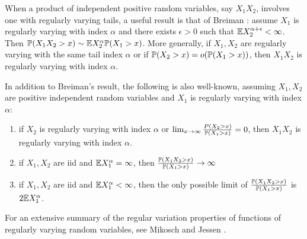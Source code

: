 When a product of independent positive random variables, say $X_1
X_2$, involves one with regularly varying tails, a useful result is
that of Breiman \cite{breiman:1965}: assume $X_1$ is regularly varying
with index $\alpha$ and there exists $\epsilon > 0$ such that
$\E X_2^{\alpha + \epsilon} < \infty$.
Then $\P(X_1 X_2 > x) \sim \E X_2^{\alpha} \P(X_1 > x)$.
More generally, if $X_1, X_2$ are regularly varying with the same tail
index $\alpha$ or if $\P(X_2 > x) = o(\P(X_1 > x))$, then $X_1 X_2$ is
regularly varying with index $\alpha$.

In addition to Breiman's result, the following is also well-known,
assuming $X_1, X_2$ are positive independent random variables and
$X_1$ is regularly varying with index $\alpha$:
\begin{enumerate}
\item if $X_2$ is regularly varying with index $\alpha$ or
  $\lim_{x \to \infty} {P(X_2 > x) \over \P(X_1 > x)} = 0$, then $X_1
  X_2$ is regularly varying with index $\alpha$.
\item if $X_1, X_2$ are iid and $\E X_1^\alpha = \infty$, then
  ${\P(X_1 X_2 > x) \over \P(X_1 > x)} \to \infty$
\item if $X_1, X_2$ are iid and $\E X_1^\alpha < \infty$, then the
  only possible limit of ${\P(X_1 X_2 > x) \over \P(X_1 > x)}$ is
  $2 \E X_1^\alpha$.
\end{enumerate}
For an extensive summary of the regular variation properties of
functions of regularly varying random variables, see Mikosch and
Jessen \cite{JessenMikosch2006}.


